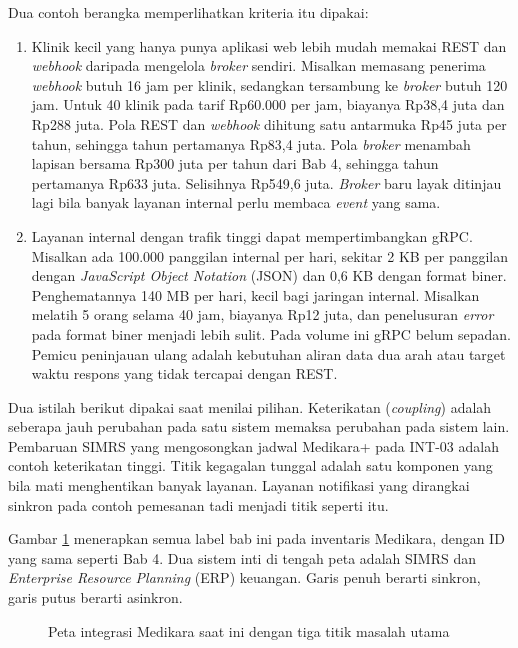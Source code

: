 Dua contoh berangka memperlihatkan kriteria itu dipakai:
\begin{enumerate}
  \item Klinik kecil yang hanya punya aplikasi web lebih mudah memakai REST dan \textit{webhook} daripada mengelola \textit{broker} sendiri.
        Misalkan memasang penerima \textit{webhook} butuh 16 jam per klinik, sedangkan tersambung ke \textit{broker} butuh 120 jam. Untuk 40
        klinik pada tarif Rp60.000 per jam, biayanya Rp38,4 juta dan Rp288 juta. Pola REST dan \textit{webhook} dihitung satu antarmuka
        Rp45 juta per tahun, sehingga tahun pertamanya Rp83,4 juta. Pola \textit{broker} menambah lapisan bersama Rp300 juta per tahun dari
        Bab 4, sehingga tahun pertamanya Rp633 juta. Selisihnya Rp549,6 juta. \textit{Broker} baru layak ditinjau lagi bila banyak layanan
        internal perlu membaca \textit{event} yang sama.
  \item Layanan internal dengan trafik tinggi dapat mempertimbangkan gRPC. Misalkan ada 100.000 panggilan internal per hari, sekitar 2 KB
        per panggilan dengan \textit{JavaScript Object Notation} (JSON) dan 0,6 KB dengan format biner. Penghematannya 140 MB per hari, kecil bagi
        jaringan internal. Misalkan melatih 5 orang selama 40 jam, biayanya Rp12 juta, dan penelusuran \textit{error} pada format biner
        menjadi lebih sulit. Pada volume ini gRPC belum sepadan. Pemicu peninjauan ulang adalah kebutuhan aliran data dua arah atau target
        waktu respons yang tidak tercapai dengan REST.
\end{enumerate}

Dua istilah berikut dipakai saat menilai pilihan. Keterikatan (\textit{coupling}) adalah seberapa jauh perubahan pada satu sistem memaksa
perubahan pada sistem lain. Pembaruan SIMRS yang mengosongkan jadwal Medikara+ pada INT-03 adalah contoh keterikatan tinggi. Titik kegagalan
tunggal adalah satu komponen yang bila mati menghentikan banyak layanan. Layanan notifikasi yang dirangkai sinkron pada contoh pemesanan tadi
menjadi titik seperti itu.

Gambar \ref{fig:ch05-peta-integrasi} menerapkan semua label bab ini pada inventaris Medikara, dengan ID yang sama seperti Bab 4. Dua sistem
inti di tengah peta adalah SIMRS dan \textit{Enterprise Resource Planning} (ERP) keuangan. Garis penuh berarti sinkron, garis putus berarti asinkron.

\begin{figure}[!htb]
  \centering
  
  \caption{Peta integrasi Medikara saat ini dengan tiga titik masalah utama}
  \label{fig:ch05-peta-integrasi}
\end{figure}

